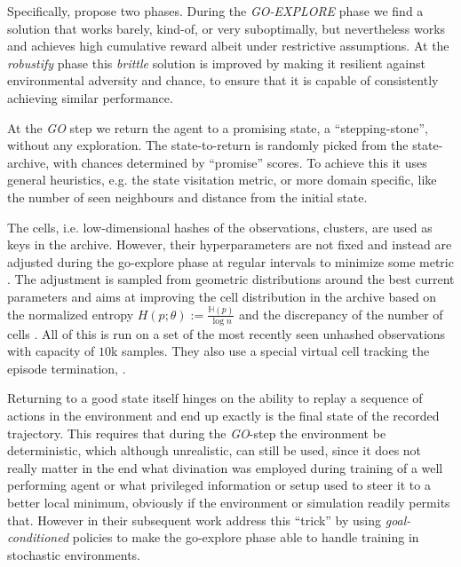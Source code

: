 \documentclass[acmsmall, nonacm]{acmart}
\begin{document}
Specifically, \citet{ecoffet_go-explore_2021} propose two phases.
% 
During the \emph{GO-EXPLORE} phase we find a solution that works barely, kind-of, or
very suboptimally, but nevertheless works and achieves high cumulative reward albeit
under restrictive assumptions.
% 
At the \emph{robustify} phase this \emph{brittle} solution is improved by making it
resilient against environmental adversity and chance, to ensure that it is capable of
consistently achieving similar performance.

At the \emph{GO} step we return the agent to a promising state, a ``stepping-stone'',
without any exploration.
%
The state-to-return is randomly picked from the state-archive, with chances determined
by ``promise'' scores. To achieve this it \citep[app.~A.5]{ecoffet_go-explore_2021} uses
general heuristics, e.g. the state visitation metric, or more domain specific, like the
number of seen neighbours and distance from the initial state.

The cells, i.e. low-dimensional hashes of the observations, clusters, are used as keys
in the archive. However, their hyperparameters are not fixed and instead are adjusted
during the go-explore phase at regular intervals to minimize some metric
\citep{ecoffet_first_2021}. The adjustment is sampled from geometric distributions
around the best current parameters and aims at improving the cell distribution in
the archive based on the normalized entropy $
    H(p; \theta)
        := \frac{\mathbb{H}(p)}{\log n}  %
$ and the discrepancy of the number of cells \citep[p.~15-16]{ecoffet_first_2021}. All
of this is run on a set of the most recently seen unhashed observations with capacity
of $10$k samples.
% 
They also use a special virtual cell tracking the episode termination,
\citep{ecoffet_first_2021}.

Returning to a good state itself hinges on the ability to replay a sequence of actions in
the environment and end up exactly is the final state of the recorded trajectory. This
requires that during the \emph{GO}-step the environment be deterministic, which although
unrealistic, can still be used, since it does not really matter in the end what divination
was employed during training of a well performing agent or what privileged information or
setup used to steer it to a better local minimum, obviously if the environment or simulation
readily permits that. However in their subsequent work \citep{ecoffet_first_2021} address
this ``trick'' by using \emph{goal-conditioned} policies to make the go-explore phase able
to handle training in stochastic environments.
\end{document}
